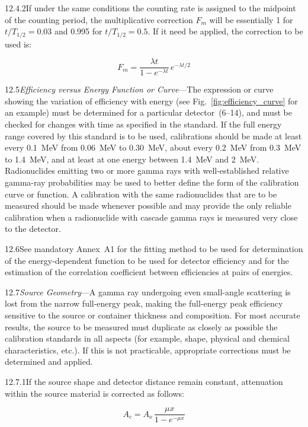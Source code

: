 \documentclass[12pt]{article}
\begin{document}
12.4.2\quad If under the same conditions the counting rate is assigned to the midpoint of
the counting period, the multiplicative correction $F_m$ will be essentially 1 for
$t/T_{1/2} = 0.03$ and 0.995 for $t/T_{1/2} = 0.5$. If it need be applied, the
correction to be used is:

\begin{equation}
  F_m = \frac{\lambda t}{1 - e^{-\lambda t}}\,e^{-\lambda t/2}
  \label{eq:decay_correction_mid}
\end{equation}

12.5\quad \textit{Efficiency versus Energy Function or Curve}---The expression or curve
showing the variation of efficiency with energy (see Fig.~\ref{fig:efficiency_curve} for
an example) must be determined for a particular detector~(6--14), and must be checked for
changes with time as specified in the standard. If the full energy range covered by this
standard is to be used, calibrations should be made at least every 0.1~MeV from 0.06~MeV
to 0.30~MeV, about every 0.2~MeV from 0.3~MeV to 1.4~MeV, and at least at one energy
between 1.4~MeV and 2~MeV. Radionuclides emitting two or more gamma rays with
well-established relative gamma-ray probabilities may be used to better define the form
of the calibration curve or function. A calibration with the same radionuclides that are
to be measured should be made whenever possible and may provide the only reliable
calibration when a radionuclide with cascade gamma rays is measured very close to the
detector.

12.6\quad See mandatory Annex~A1 for the fitting method to be used for determination of
the energy-dependent function to be used for detector efficiency and for the estimation
of the correlation coefficient between efficiencies at pairs of energies.

12.7\quad \textit{Source Geometry}---A gamma ray undergoing even small-angle scattering
is lost from the narrow full-energy peak, making the full-energy peak efficiency sensitive
to the source or container thickness and composition. For most accurate results, the
source to be measured must duplicate as closely as possible the calibration standards in
all aspects (for example, shape, physical and chemical characteristics, etc.). If this is
not practicable, appropriate corrections must be determined and applied.

12.7.1\quad If the source shape and detector distance remain constant, attenuation within
the source material is corrected as follows:

\begin{equation}
  A_c = A_o\,\frac{\mu x}{1 - e^{-\mu x}}
  \label{eq:source_attenuation}
\end{equation}
\end{document}
